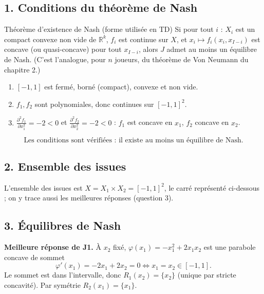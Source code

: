 \documentclass[11pt,a4paper]{article}
\begin{document}
\subsection*{1. Conditions du théorème de Nash}
\begin{propbox}{Théorème d'existence de Nash (forme utilisée en TD)}
Si pour tout $i$ : $X_i$ est un compact convexe non vide de $\mathbb{R}^{k}$, $f_i$ est continue sur $X$, et $x_i\mapsto f_i(x_i,x_{I-i})$ est concave (ou quasi-concave) pour tout $x_{I-i}$, alors $J$ admet au moins un équilibre de Nash. (C'est l'analogue, pour $n$ joueurs, du théorème de Von Neumann du chapitre 2.)
\end{propbox}
\begin{enumerate}[label=(\alph*)]
\item $[-1,1]$ est fermé, borné (compact), convexe et non vide. \checkmark
\item $f_1,f_2$ sont polynomiales, donc continues sur $[-1,1]^2$. \checkmark
\item $\frac{\partial^2 f_1}{\partial x_1^2}=-2<0$ et $\frac{\partial^2 f_2}{\partial x_2^2}=-2<0$ : $f_1$ est concave en $x_1$, $f_2$ concave en $x_2$. \checkmark
\end{enumerate}
\[
\boxed{\text{Les conditions sont vérifiées : il existe au moins un équilibre de Nash.}}
\]

\subsection*{2. Ensemble des issues}
L'ensemble des issues est $X=X_1\times X_2=[-1,1]^2$, le carré représenté ci-dessous ; on y trace aussi les meilleures réponses (question 3).
\begin{center}
\end{center}

\subsection*{3. Équilibres de Nash}
\textbf{Meilleure réponse de J1.} À $x_2$ fixé, $\varphi(x_1)=-x_1^2+2x_1x_2$ est une parabole concave de sommet
\[
\varphi'(x_1)=-2x_1+2x_2=0\iff x_1=x_2\in[-1,1].
\]
Le sommet est dans l'intervalle, donc $R_1(x_2)=\{x_2\}$ (unique par stricte concavité). Par symétrie $R_2(x_1)=\{x_1\}$.
\end{document}
